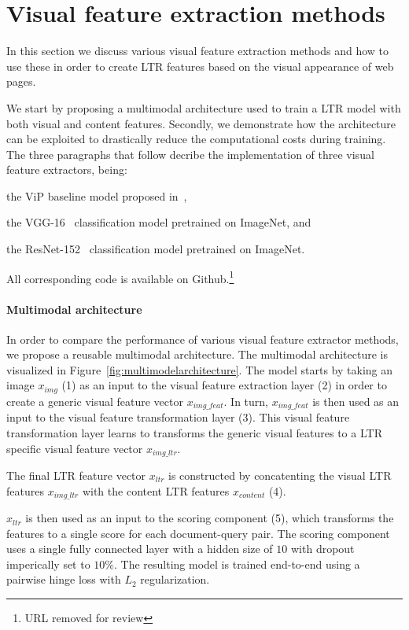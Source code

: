 
\section{Visual feature extraction methods}
In this section we discuss various visual feature extraction methods and how to use these in order to create \ac{LTR} features based on the visual appearance of web pages. 

We start by proposing a multimodal architecture used to train a \ac{LTR} model with both visual and content features. 
Secondly, we demonstrate how the architecture can be exploited to drastically reduce the computational costs during training. 
The three paragraphs that follow decribe the implementation of three visual feature extractors, being:
\begin{inparaenum}[(i)]
\item the ViP baseline model proposed in~\citet{fan2017learning}, 
\item the VGG-16~\cite{simonyan2014very} classification model pretrained on ImageNet, and
\item the ResNet-152~\cite{he2016deep} classification model pretrained on ImageNet.
\end{inparaenum} 

All corresponding code is available on Github.\footnote{URL removed for review}

\paragraph{Multimodal architecture}
In order to compare the performance of various visual feature extractor methods, we propose a reusable multimodal architecture. 
The multimodal architecture is visualized in Figure~\ref{fig:multimodelarchitecture}. 
The model starts by taking an image $x_{img}$ (1) as an input to the visual feature extraction layer (2) in order to create a generic visual feature vector $x_{img\_feat}$. In turn, $x_{img\_feat}$ is then used as an input to the visual feature transformation layer (3).
This visual feature transformation layer learns to transforms the generic visual features to a \ac{LTR} specific visual feature vector $x_{img\_ltr}$.

The final \ac{LTR} feature vector $x_{ltr}$ is constructed by concatenting the visual \ac{LTR} features $x_{img\_ltr}$ with the content \ac{LTR} features $x_{content}$ (4). 

$x_{ltr}$ is then used as an input to the scoring component (5), which transforms the features to a single score for each document-query pair. The scoring component uses a single fully connected layer with a hidden size of $10$ with dropout imperically set to $10\%$. The resulting model is trained end-to-end using a pairwise hinge loss with $L_2$ regularization. 


